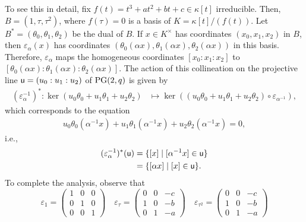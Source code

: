\begin{rem}
    To see this in detail, fix $f(t)=t^3+at^2+bt+c\in\kappa[t]$ irreducible. Then, $B=(1,\tau,\tau^2)$, where $f(\tau)=0$ is a basis of $K=\kappa[t]/(f(t))$. Let $B^*=(\theta_0,\theta_1,\theta_2)$ be the dual of $B$.  If $x\in K^\times$ has coordinates $(x_0,x_1,x_2)$ in $B$, then $\varepsilon_\alpha(x)$ has coordinates $(\theta_0(\alpha x),\theta_1(\alpha x),\theta_2(\alpha x))$ in this basis. Therefore, $\varepsilon_\alpha$ maps the homogeneous coordinates $[x_0:x_1:x_2]$ to $[\theta_0(\alpha x):\theta_1(\alpha x):\theta_2(\alpha x)]$. The action of this collineation on the projective line $\block u=(u_0:u_1:u_2)$ of $\PG(2,q)$ is given by
    \begin{align*}
        (\varepsilon_{\alpha}^{-1})^*
            \colon\ker(u_0\theta_0+u_1\theta_1+u_2\theta_2)
            &\mapsto \ker((u_0\theta_0+u_1\theta_1+u_2\theta_2)
                \circ\varepsilon_{\alpha^{-1}}),
    \end{align*}
    which corresponds to the equation
    \begin{align*}
        u_0\theta_0(\alpha^{-1}x)
            + u_1\theta_1(\alpha^{-1}x)
            + u_2\theta_2(\alpha^{-1}x)=0,
    \end{align*}
    i.e.,
    \begin{align}\label{eq:action-on-lines}
        (\varepsilon_\alpha^{-1})^*(\mathsf u)
            &= \{[x]\mid
                [\alpha^{-1}x]\in\mathsf u\}\nonumber\\
            &= \{[\alpha x]\mid [x]\in\mathsf u\}.
    \end{align}
    To complete the analysis, observe that
    $$
        \varepsilon_1=
            \begin{pmatrix}
                1   &0  &0\\
                0   &1  &0\\
                0   &0  &1
            \end{pmatrix}
        \quad
        \varepsilon_\tau=
            \begin{pmatrix}
                0   &0  &-c\\
                1   &0  &-b\\
                0   &1  &-a
            \end{pmatrix}
        \quad
        \varepsilon_{\tau^2}=
            \begin{pmatrix}
                0   &0  &-c\\
                1   &0  &-b\\
                0   &1  &-a

\end{pmatrix}$$
\end{rem}
